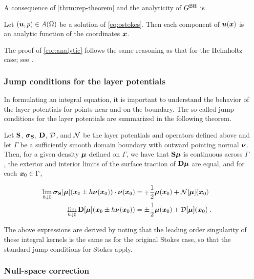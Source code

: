 A consequence of \cref{thrm:rep-theorem} and the analyticity
of $G^{\textrm{BH}}$ is 
\begin{cor}
\label{cor:analytic}  
  Let $({\boldsymbol u},p) \in A(\Omega)$ be a solution of \cref{eq:ostokes}.
  Then each component of ${\boldsymbol u}({\boldsymbol x})$ is an analytic function
  of the coordinates ${\boldsymbol x}$.
\end{cor}

The proof of \cref{cor:analytic} follows the same reasoning as
that for the Helmholtz case; see \cite[Theorem 3.5]{colton1983integral}.

\subsubsection{Jump conditions for the layer potentials}

In formulating an integral equation, it is important
to understand the behavior of the layer potentials
for points near and on the boundary. The so-called jump
conditions for the layer potentials are summarized in the
following theorem.


\begin{lem} \label{lem:jump-conds}
  Let ${\bf S}$, ${\boldsymbol \sigma}_{\bf S}$, ${\bf D}$, ${\mathcal D}$, and ${\mathcal N}$ be
  the layer potentials and operators defined above and
  let $\Gamma$ be a sufficiently smooth domain boundary
  with outward pointing normal ${\boldsymbol \nu}$. Then, for
  a given density ${\boldsymbol \mu}$ defined on $\Gamma$,
  we have that ${\bf S} {\boldsymbol \mu}$
  is continuous across $\Gamma$, the exterior and interior
  limits of the surface traction of ${\bf D} {\boldsymbol \mu}$ are equal,
  and for each ${\boldsymbol x}_0 \in \Gamma$,

  \begin{align}
    \lim_{h \downarrow 0} {\boldsymbol \sigma}_{\bf S}[{\boldsymbol \mu}]({\boldsymbol x}_0 \pm h{\boldsymbol \nu}({\boldsymbol x}_0)) \cdot {\boldsymbol \nu}({\boldsymbol x}_0)
    &= \mp \frac{1}{2} {\boldsymbol \mu}({\boldsymbol x}_0) + {\mathcal N}[{\boldsymbol \mu}]({\boldsymbol x}_0) \\
    \lim_{h \downarrow 0} {\bf D}[{\boldsymbol \mu}]({\boldsymbol x}_0 \pm h{\boldsymbol \nu}({\boldsymbol x}_0)) 
    &= \pm \frac{1}{2} {\boldsymbol \mu}({\boldsymbol x}_0) + {\mathcal D}[{\boldsymbol \mu}]({\boldsymbol x}_0)    \; .
  \end{align}
\end{lem}

The above expressions are derived by noting that the
leading order singularity of these integral kernels
is the same as for the original Stokes case, so that
the standard jump conditions for Stokes
\cite{KimSangtae1991M:pa,Pozrikidis1992}
apply. 


\subsubsection{Null-space correction}

